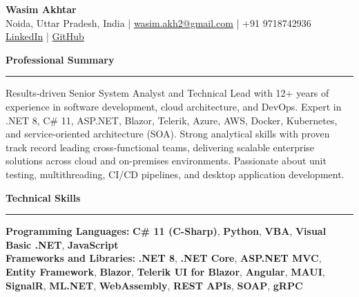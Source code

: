 \documentclass[10pt,a4paper]{article}
\newcommand{\sectionheader}[1]{%
    \vspace{8pt}
    {\large\bfseries #1}
    \vspace{2pt}
    \hrule
    \vspace{4pt}
}
\begin{document}

\begin{center}
    {\LARGE\bfseries Wasim Akhtar}\\[4pt]
    Noida, Uttar Pradesh, India | \href{mailto:wasim.akh2@gmail.com}{wasim.akh2@gmail.com} | +91 9718742936\\
    \href{https://linkedin.com/in/wasim-akhtar-3b7436b}{LinkedIn} | \href{https://github.com/wasimakh2}{GitHub}
\end{center}

\vspace{2pt}


\sectionheader{Professional Summary}

Results-driven Senior System Analyst and Technical Lead with 12+ years of experience in software development, cloud architecture, and DevOps. Expert in .NET 8, C\# 11, ASP.NET, Blazor, Telerik, Azure, AWS, Docker, Kubernetes, and service-oriented architecture (SOA). Strong analytical skills with proven track record leading cross-functional teams, delivering scalable enterprise solutions across cloud and on-premises environments. Passionate about unit testing, multithreading, CI/CD pipelines, and desktop application development.


\sectionheader{Technical Skills}

\textbf{Programming Languages:} \textbf{C\# 11 (C-Sharp)}, \textbf{Python}, \textbf{VBA}, \textbf{Visual Basic .NET}, \textbf{JavaScript}\\[2pt]

\textbf{Frameworks and Libraries:} \textbf{.NET 8}, \textbf{.NET Core}, \textbf{ASP.NET MVC}, \textbf{Entity Framework}, \textbf{Blazor}, \textbf{Telerik UI for Blazor}, \textbf{Angular}, \textbf{MAUI}, \textbf{SignalR}, \textbf{ML.NET}, \textbf{WebAssembly}, \textbf{REST APIs}, \textbf{SOAP}, \textbf{gRPC}\\[2pt]
\end{document}
